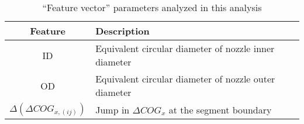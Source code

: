 \begin{table}[h]
\begin{tabular}{| c | l |}
  \hline
  \textbf{Feature} & \textbf{Description} \\
  \hline
   ID      & Equivalent circular diameter of nozzle inner diameter \\
  \hline
   OD      & Equivalent circular diameter of nozzle outer diameter \\
  \hline
  $\Delta  (\Delta COG_{x, (ij)})$  & Jump in $\Delta COG_{x}$ at the segment boundary  \\  
  \hline
\end{tabular}
\caption{``Feature vector'' parameters analyzed in this
analysis}
\label{tab:featureVector}
\end{table} 

\endinput
